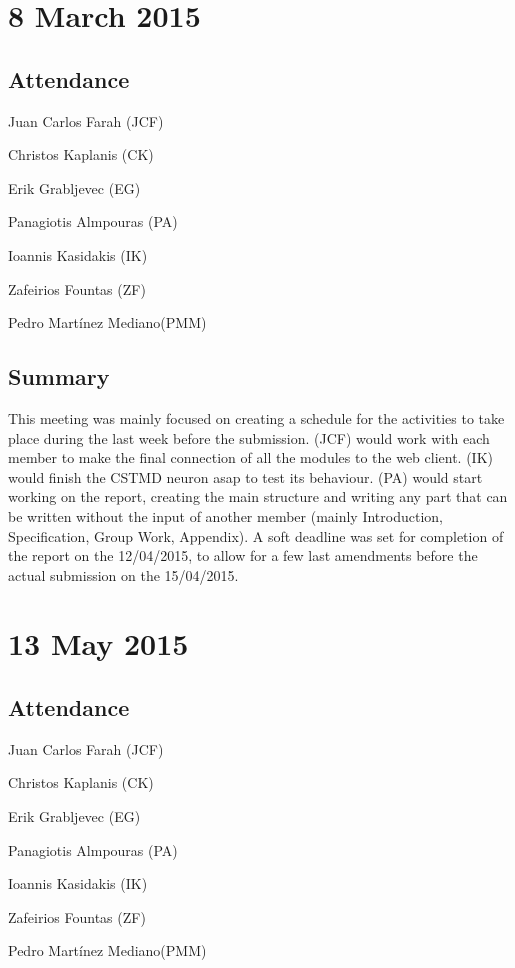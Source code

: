 \documentclass[a4paper,11pt]{article}
\begin{document}
\maketitle
\section*{8 March 2015}
\subsection*{Attendance}
\begin{compactenum}
\item Juan Carlos Farah (JCF)
\item Christos Kaplanis (CK)
\item Erik Grabljevec (EG)
\item Panagiotis Almpouras (PA)
\item Ioannis Kasidakis (IK)
\item Zafeirios Fountas (ZF)
\item Pedro Martínez Mediano(PMM)
\end{compactenum}

\subsection*{Summary}
This meeting was mainly focused on creating a schedule for the activities to take place during the last week before the submission. (JCF) would work with each member to make the final connection of all the modules to the web client. (IK) would finish the CSTMD neuron asap to test its behaviour. (PA) would start working on the report, creating the main structure and writing any part that can be written without the input of another member (mainly Introduction,  Specification, Group Work, Appendix). A soft deadline was set for completion of the report on the 12/04/2015, to allow for a few last amendments before the actual submission on the 15/04/2015.

\maketitle
\section*{13 May 2015}
\subsection*{Attendance}
\begin{compactenum}
\item Juan Carlos Farah (JCF)
\item Christos Kaplanis (CK)
\item Erik Grabljevec (EG)
\item Panagiotis Almpouras (PA)
\item Ioannis Kasidakis (IK)
\item Zafeirios Fountas (ZF)
\item Pedro Martínez Mediano(PMM)
\end{compactenum}
\end{document}
